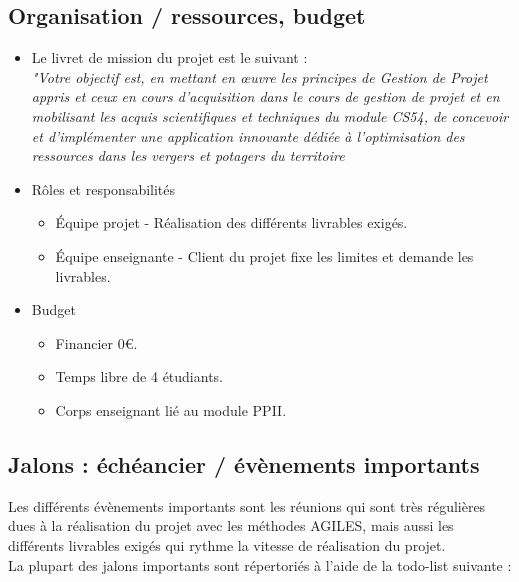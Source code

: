 \documentclass{report}
\begin{document}
\subsection*{Organisation / ressources, budget}
\begin{itemize}
    \item Le livret de mission du projet est le suivant : \\ 
    \textit{"Votre objectif est, en mettant en œuvre les principes de Gestion de Projet appris et
    ceux en cours d’acquisition dans le cours de gestion de projet et en mobilisant les acquis
    scientifiques et techniques du module CS54, de concevoir et d’implémenter une application
    innovante dédiée à l’optimisation des ressources dans les vergers et potagers du territoire}
    \item Rôles et responsabilités
    \begin{itemize}
        \item Équipe projet - Réalisation des différents livrables exigés.
        \item Équipe enseignante - Client du projet fixe les limites et demande les livrables.
    \end{itemize}
    \item Budget
    \begin{itemize}
        \item Financier 0€.
        \item Temps libre de 4 étudiants.
        \item Corps enseignant lié au module PPII.
    \end{itemize}
    
\end{itemize}
\subsection*{Jalons : échéancier / évènements importants }
Les différents évènements importants sont les réunions qui sont très régulières dues à la réalisation du projet avec les méthodes AGILES, mais aussi les différents livrables exigés qui rythme la vitesse de réalisation du projet.
\vspace{0.5cm} \\
La plupart des jalons importants sont répertoriés à l'aide de la todo-list suivante :
\end{document}
